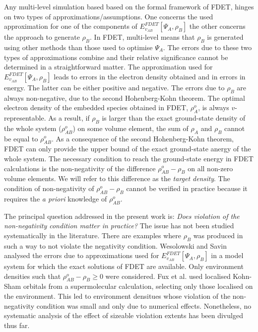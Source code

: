 \documentclass[journal=jctcce,manuscript=article]{achemso}
\newcommand{\nr}[1]{\color{red}#1\color{black}}
\begin{document}
Any multi-level simulation based based on the formal framework of FDET, %
hinges on two types of approximations/assumptions.
One concerns the used approximation for one of the components of ${E}_{v_{AB}}^{FDET}[\Psi_{A},\rho_B]$ the other concerns the approach to generate $\rho_B$. In FDET, multi-level mean\nr{s } that  $\rho_B$ is generated using other methods than \nr{those } used to optimise $\Psi_A$. The errors due to these two types of approximations combine and their relative significance cannot be determined  in a straightforward matter. The approximation used for ${E}_{v_{AB}}^{FDET}[\Psi_{A},\rho_B]$ leads to errors in the electron density obtained and in errors in energy. The latter can be either positive and negative. The errors due to  $\rho_B$ are always non-negative\nr{, due to the second Hohenberg-Kohn theorem}.
The optimal electron density of the embedded species obtained in FDET\nr{, $\rho_A^o$, } is always $v$-representable. 
As a result, if $\rho_B$
is larger than the exact ground-state density of the whole system \nr{($\rho_{AB}^o$) } on some volume element, the sum of $\rho_A$ and
$\rho_B$ cannot be equal to \nr{$\rho_{AB}^o$}. As a consequence of the second Hohenberg-Kohn theorem, FDET can only provide the upper bound of the exact ground-state anergy of the whole system. The necessary condition to reach the ground-state energy in FDET calculations is \nr{the } non-negativity of the difference \nr{$\rho_{AB}^o-\rho_B$ } on all non-zero volume elements.
We will refer to this difference as the {\it target density}.
The condition of non-negativity of \nr{$\rho_{AB}^o-\rho_B$ }cannot be verified in practice because it requires the {\it a priori} knowledge of 
$\rho_{AB}^o$.

The principal question addressed in the present work is:  {\it Does violation of the non-negativity condition matter in practice?}  
The issue has not been studied systematically in the literature.
\nr{ There are examples where $\rho_B$ was produced in such a way to not violate the negativity condition. }
Wesolowski and Savin analysed the errors due to approximations used for ${E}_{v_{AB}}^{FDET}[\Psi_{A},\rho_B]$ in a model system for which the exact solutions of FDET are available. \nr{Only environment densities such that $\rho_{AB}^o-\rho_B \geq 0$ were considered. \cite{Wesolowski2013}}
\nr{Fux et al. \cite{Fux2010} used localised Kohn-Sham orbitals from a supermolecular calculation, selecting only those localised on the environment. This led to environment densitues whose violation of the non-negativity condition was small and only due to numerical effects. Nonetheless, no systematic analysis of the effect of sizeable violation extents has been divulged thus far.}
\end{document}
